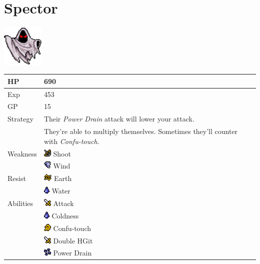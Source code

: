 \section{Spector}
\label{monster:spector}

\includegraphics[height=2cm,keepaspectratio]{./resources/monster/spector}

\begin{longtable}{ l p{9cm} }
	HP
	& 690
\\ \hline
	Exp
	& 453
\\ \hline
	GP
	& 15
\\ \hline
	Strategy
	& Their \textit{Power Drain} attack will lower your attack. \\
	& They're able to multiply themselves. Sometimes they'll counter with \textit{Confu-touch}.
\\ \hline
	Weakness
	& \includegraphics[height=1em,keepaspectratio]{./resources/effects/shoot} Shoot \\
	& \includegraphics[height=1em,keepaspectratio]{./resources/effects/wind} Wind
\\ \hline
	Resist
	& \includegraphics[height=1em,keepaspectratio]{./resources/effects/earth} Earth \\
	& \includegraphics[height=1em,keepaspectratio]{./resources/effects/water} Water
\\ \hline
	Abilities
	& \includegraphics[height=1em,keepaspectratio]{./resources/effects/damage} Attack \\
	& \includegraphics[height=1em,keepaspectratio]{./resources/effects/water} Coldness \\
	& \includegraphics[height=1em,keepaspectratio]{./resources/effects/confusion} Confu-touch \\
	& \includegraphics[height=1em,keepaspectratio]{./resources/effects/damage} Double HGit \\
	& \includegraphics[height=1em,keepaspectratio]{./resources/effects/drain} Power Drain
\end{longtable}
